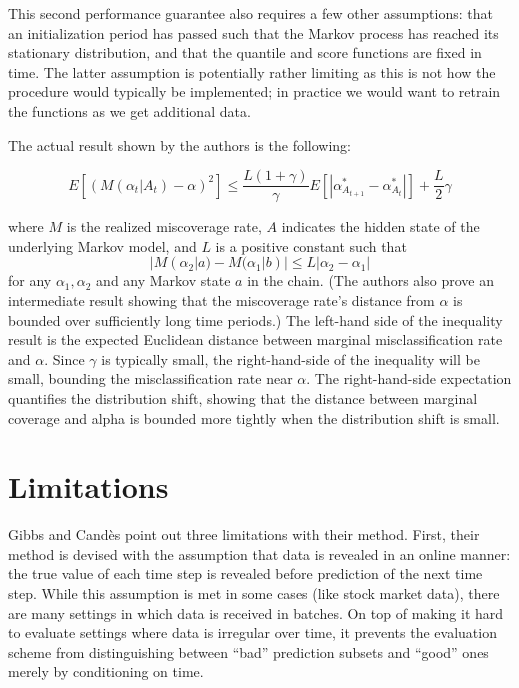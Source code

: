 \documentclass[
]{article}
\begin{document}
This second performance guarantee also requires a few other assumptions:
that an initialization period has passed such that the Markov process
has reached its stationary distribution, and that the quantile and score
functions are fixed in time. The latter assumption is potentially rather
limiting as this is not how the procedure would typically be
implemented; in practice we would want to retrain the functions as we
get additional data.

The actual result shown by the authors is the following:

\[ E[(M(\alpha_t | A_t) - \alpha)^2 ] \le \frac{L(1 + \gamma)}{\gamma} E [ | \alpha_{A_{t+1}}^* -\alpha_{A_t}^* | ] + \frac{L}{2} \gamma \]

where \(M\) is the realized miscoverage rate, \(A\) indicates the hidden
state of the underlying Markov model, and \(L\) is a positive constant
such that
\[ | M(\alpha_2 | a) - M(\alpha_1 | b) | \le L | \alpha_2 - \alpha_1 | \]
for any \(\alpha_1,\alpha_2\) and any Markov state \(a\) in the chain.
(The authors also prove an intermediate result showing that the
miscoverage rate's distance from \(\alpha\) is bounded over sufficiently
long time periods.) The left-hand side of the inequality result is the
expected Euclidean distance between marginal misclassification rate and
\(\alpha\). Since \(\gamma\) is typically small, the right-hand-side of
the inequality will be small, bounding the misclassification rate near
\(\alpha\). The right-hand-side expectation quantifies the distribution
shift, showing that the distance between marginal coverage and alpha is
bounded more tightly when the distribution shift is small.

\hypertarget{limitations}{%
\section{Limitations}\label{limitations}}

Gibbs and Candès point out three limitations with their method. First,
their method is devised with the assumption that data is revealed in an
online manner: the true value of each time step is revealed before
prediction of the next time step. While this assumption is met in some
cases (like stock market data), there are many settings in which data is
received in batches. On top of making it hard to evaluate settings where
data is irregular over time, it prevents the evaluation scheme from
distinguishing between ``bad'' prediction subsets and ``good'' ones
merely by conditioning on time.
\end{document}
